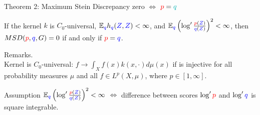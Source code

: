 \begin{frame}
\begin{columns}
\begin{column}{.33\linewidth}
\vspace{-0.75cm}
\begin{block}{Theorem 2: Maximum Stein Discrepancy zero $\iff$ ${ \color{red} p} =  {\color{lightblue} q}$}
\vspace{1cm}


\large
If the kernel $k$ is $C_0$-universal,
$\mathbb{E}_{{ \color{blue} { \color{blue} q}}} h_{{ \color{blue} { \color{blue} q}}}({ \color{blue} Z},{ \color{blue} Z})<\infty$,
and $\mathbb{E}_{{ \color{blue} { \color{blue} q}}} \left( \log' \frac{{\color{red} p}({ \color{blue} Z})}{{ \color{blue} q}({ \color{blue} Z})} \right)^{2}  < \infty$,
then $MSD({\color{red} p},{ \color{blue} q},G) =0$ if and only if ${\color{red} p}={ \color{blue} q}$.

\vspace{1cm}
\normalsize
Remarks.\\
Kernel is $C_0$-universal:  $f \to \int_X f(x) k(x,\cdot) d\mu(x)$ if is injective for all probability measures $\mu$ and all  $f \in L^p(X,\mu)$, where  $p \in [1,\infty] $. 
\vspace{0.5cm}

Assumption $\mathbb{E}_{{ \color{blue} q}} \left(\log' \frac{{\color{red} p}({ \color{blue} Z})}{{ \color{blue} q}({ \color{blue} Z})}  \right)^{2}<\infty$ $\iff$ difference between scores $\log' \color{red} p$ and $\log' \color{blue} q$  is square integrable.
\end{block}


\end{column}
\end{columns}
\end{frame}
